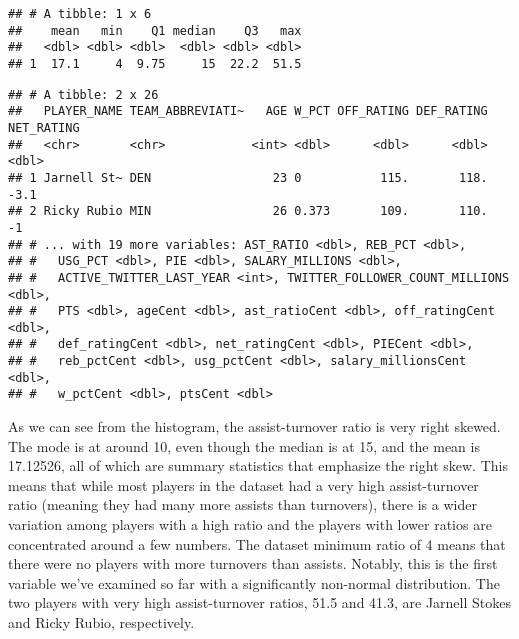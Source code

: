 \documentclass[]{article}
\newenvironment{Shaded}{\begin{snugshade}}{\end{snugshade}}
\newcommand{\DecValTok}[1]{\textcolor[rgb]{0.00,0.00,0.81}{#1}}
\newcommand{\KeywordTok}[1]{\textcolor[rgb]{0.13,0.29,0.53}{\textbf{#1}}}
\newcommand{\NormalTok}[1]{#1}
\newcommand{\OperatorTok}[1]{\textcolor[rgb]{0.81,0.36,0.00}{\textbf{#1}}}
\newcommand{\StringTok}[1]{\textcolor[rgb]{0.31,0.60,0.02}{#1}}
\begin{document}
\begin{verbatim}
## # A tibble: 1 x 6
##    mean   min    Q1 median    Q3   max
##   <dbl> <dbl> <dbl>  <dbl> <dbl> <dbl>
## 1  17.1     4  9.75     15  22.2  51.5
\end{verbatim}

\begin{Shaded}
\end{Shaded}

\begin{verbatim}
## # A tibble: 2 x 26
##   PLAYER_NAME TEAM_ABBREVIATI~   AGE W_PCT OFF_RATING DEF_RATING NET_RATING
##   <chr>       <chr>            <int> <dbl>      <dbl>      <dbl>      <dbl>
## 1 Jarnell St~ DEN                 23 0           115.       118.       -3.1
## 2 Ricky Rubio MIN                 26 0.373       109.       110.       -1  
## # ... with 19 more variables: AST_RATIO <dbl>, REB_PCT <dbl>,
## #   USG_PCT <dbl>, PIE <dbl>, SALARY_MILLIONS <dbl>,
## #   ACTIVE_TWITTER_LAST_YEAR <int>, TWITTER_FOLLOWER_COUNT_MILLIONS <dbl>,
## #   PTS <dbl>, ageCent <dbl>, ast_ratioCent <dbl>, off_ratingCent <dbl>,
## #   def_ratingCent <dbl>, net_ratingCent <dbl>, PIECent <dbl>,
## #   reb_pctCent <dbl>, usg_pctCent <dbl>, salary_millionsCent <dbl>,
## #   w_pctCent <dbl>, ptsCent <dbl>
\end{verbatim}

As we can see from the histogram, the assist-turnover ratio is very
right skewed. The mode is at around 10, even though the median is at 15,
and the mean is 17.12526, all of which are summary statistics that
emphasize the right skew. This means that while most players in the
dataset had a very high assist-turnover ratio (meaning they had many
more assists than turnovers), there is a wider variation among players
with a high ratio and the players with lower ratios are concentrated
around a few numbers. The dataset minimum ratio of 4 means that there
were no players with more turnovers than assists. Notably, this is the
first variable we've examined so far with a significantly non-normal
distribution. The two players with very high assist-turnover ratios,
51.5 and 41.3, are Jarnell Stokes and Ricky Rubio, respectively.
\end{document}
